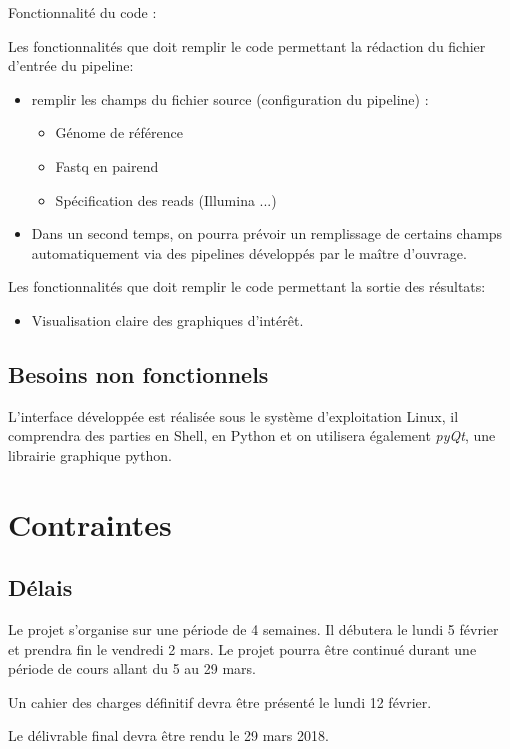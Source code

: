 \documentclass[12pt]{article}
\begin{document}
Fonctionnalité du code :

Les fonctionnalités que doit remplir le code permettant la rédaction du fichier d'entrée du pipeline:

\begin{itemize}
\item remplir les champs du fichier source (configuration du pipeline) :
\begin{itemize}
\item Génome de référence
\item Fastq en pairend 
\item Spécification des reads (Illumina ...)
\end{itemize}
\item Dans un second temps, on pourra prévoir un remplissage de certains champs automatiquement via des pipelines développés par le maître d'ouvrage.
\end{itemize}

Les fonctionnalités que doit remplir le code permettant la sortie des résultats: 

\begin{itemize}
\item Visualisation claire des graphiques d’intérêt.
\end{itemize}

\subsection{Besoins non fonctionnels}

L'interface développée est réalisée sous le système d'exploitation Linux, il comprendra des parties en Shell, en Python et on utilisera également \textit{pyQt}, une librairie graphique python.

\section{Contraintes}
\subsection{Délais}

Le projet s'organise sur une période de 4 semaines. Il débutera le lundi 5 février et prendra fin le vendredi 2 mars. Le projet pourra être continué durant une période de cours allant du 5 au 29 mars.

Un cahier des charges définitif devra être présenté le lundi 12 février.

Le délivrable final devra être rendu le 29 mars 2018.
\end{document}
